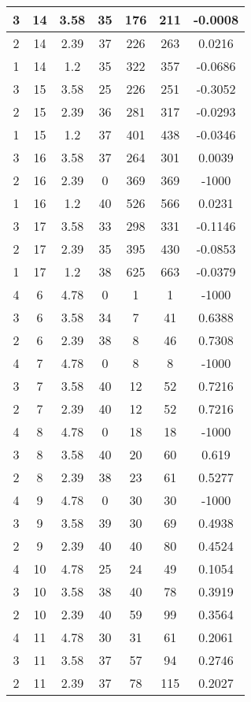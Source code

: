 \documentclass[letterpaper, 12pt]{article}
\begin{document}
\begin{longtable}{|c|c|c|c|c|c|c|}
\hline
3 & 14 & 3.58 & 35 & 176 & 211 & -0.0008 \\
\hline
2 & 14 & 2.39 & 37 & 226 & 263 & 0.0216 \\
\hline
1 & 14 & 1.2 & 35 & 322 & 357 & -0.0686 \\
\hline
3 & 15 & 3.58 & 25 & 226 & 251 & -0.3052 \\
\hline
2 & 15 & 2.39 & 36 & 281 & 317 & -0.0293 \\
\hline
1 & 15 & 1.2 & 37 & 401 & 438 & -0.0346 \\
\hline
3 & 16 & 3.58 & 37 & 264 & 301 & 0.0039 \\
\hline
2 & 16 & 2.39 & 0 & 369 & 369 & -1000 \\
\hline
1 & 16 & 1.2 & 40 & 526 & 566 & 0.0231 \\
\hline
3 & 17 & 3.58 & 33 & 298 & 331 & -0.1146 \\
\hline
2 & 17 & 2.39 & 35 & 395 & 430 & -0.0853 \\
\hline
1 & 17 & 1.2 & 38 & 625 & 663 & -0.0379 \\
\hline
4 & 6 & 4.78 & 0 & 1 & 1 & -1000 \\
\hline
3 & 6 & 3.58 & 34 & 7 & 41 & 0.6388 \\
\hline
2 & 6 & 2.39 & 38 & 8 & 46 & 0.7308 \\
\hline
4 & 7 & 4.78 & 0 & 8 & 8 & -1000 \\
\hline
3 & 7 & 3.58 & 40 & 12 & 52 & 0.7216 \\
\hline
2 & 7 & 2.39 & 40 & 12 & 52 & 0.7216 \\
\hline
4 & 8 & 4.78 & 0 & 18 & 18 & -1000 \\
\hline
3 & 8 & 3.58 & 40 & 20 & 60 & 0.619 \\
\hline
2 & 8 & 2.39 & 38 & 23 & 61 & 0.5277 \\
\hline
4 & 9 & 4.78 & 0 & 30 & 30 & -1000 \\
\hline
3 & 9 & 3.58 & 39 & 30 & 69 & 0.4938 \\
\hline
2 & 9 & 2.39 & 40 & 40 & 80 & 0.4524 \\
\hline
4 & 10 & 4.78 & 25 & 24 & 49 & 0.1054 \\
\hline
3 & 10 & 3.58 & 38 & 40 & 78 & 0.3919 \\
\hline
2 & 10 & 2.39 & 40 & 59 & 99 & 0.3564 \\
\hline
4 & 11 & 4.78 & 30 & 31 & 61 & 0.2061 \\
\hline
3 & 11 & 3.58 & 37 & 57 & 94 & 0.2746 \\
\hline
2 & 11 & 2.39 & 37 & 78 & 115 & 0.2027 \\

\end{longtable}
\end{document}
